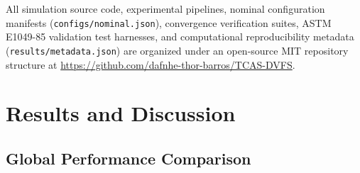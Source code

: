 \documentclass[a4paper,fleqn]{cas-dc}
\begin{document}
All simulation source code, experimental pipelines, nominal configuration manifests (\texttt{configs/nominal.json}), convergence verification suites, ASTM E1049-85 validation test harnesses, and computational reproducibility metadata (\texttt{results/metadata.json}) are organized under an open-source MIT repository structure at \url{https://github.com/dafnhe-thor-barros/TCAS-DVFS}.

\section{Results and Discussion}
\label{sec:results}

\subsection{Global Performance Comparison}
\end{document}
